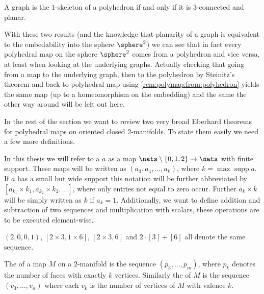 \begin{theorem} A graph is the $1$-skeleton of a polyhedron if and only if it is $3$-connected and planar.
\end{theorem}

With these two results (and the knowledge that planarity of a graph is equivalent to the embedability into the sphere $\sphere^2$) we can see that in fact every polyhedral map on the sphere $\sphere^2$ comes from a polyhedron and vice versa, at least when looking at the underlying graphs. Actually checking that going from a map to the underlying graph, then to the polyhedron by {\sc Steinitz}'s theorem and back to polyhedral map using \autoref{rem:polymap:from:polyhedron} yields the same map (up to a homeomorphism on the embedding) and the same the other way around will be left out here.

In the rest of the section we want to review two very broad {\sc Eberhard} theorems for polyhedral maps on oriented closed $2$-manifolds. To state them easily we need a few more definitions.

\begin{definition}[Sequence]
  In this thesis we will refer to a  $a$ as a map $\nats \setminus \{0, 1, 2\} \rightarrow \nats$ with finite support. These maps will be written as $(a_3, a_4, ..., a_k)$, where $k = \operatorname{max} \operatorname{supp} a$. If $a$ has a small but wide support this notation will be further abbreviated by $[a_{k_1} \times k_1, a_{k_2} \times k_2, ...]$, where only entries not equal to zero occur. Further $a_k \times k$ will be simply written as $k$ if $a_k = 1$. Additionally, we want to define addition and subtraction of two sequences and multiplication with scalars, these operations are to be executed element-wise.
\end{definition}
\begin{example}
  $(2, 0, 0, 1)$, $[2 \times 3, 1 \times 6]$, $[2 \times 3, 6]$ and $2 \cdot [3] + [6]$ all denote the same sequence.
\end{example}
\begin{definition}\label{def:relizable}
  The  of a map $M$ on a $2$-manifold is the sequence $(p_3, \dots, p_m)$, where $p_k$ denotes the number of faces with exactly $k$ vertices. Similarly the  of $M$ is the sequence $(v_3, \dots, v_n)$ where each $v_k$ is the number of vertices of $M$ with valence $k$.
\end{definition}

